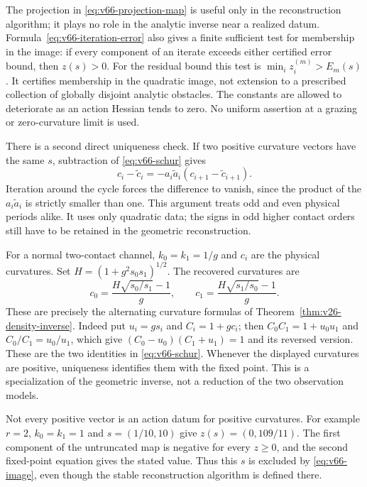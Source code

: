 The projection in \eqref{eq:v66-projection-map} is useful only in the
reconstruction algorithm; it plays no role in the analytic inverse near
a realized datum.  Formula~\eqref{eq:v66-iteration-error} also gives a
finite sufficient test for membership in the image: if every component
of an iterate exceeds either certified error bound, then $z(s)>0$.
For the residual bound this test is $\min_i z_i^{(m)}>E_m(s)$.
It certifies membership in the quadratic image, not extension to a
prescribed collection of globally disjoint analytic obstacles.
The constants are allowed to deteriorate as an action Hessian tends to
zero.  No uniform assertion at a grazing or zero-curvature limit is used.

There is a second direct uniqueness check.  If two positive curvature
vectors have the same $s$, subtraction of \eqref{eq:v66-schur} gives
\[
 c_i-\widetilde c_i
       =-a_i\widetilde a_i(c_{i+1}-\widetilde c_{i+1}).
\]
Iteration around the cycle forces the difference to vanish, since the
product of the $a_i\widetilde a_i$ is strictly smaller than one.
This argument treats odd and even physical periods alike.  It uses only
quadratic data; the signs in odd higher contact orders still have to be
retained in the geometric reconstruction.

For a normal two-contact channel, $k_0=k_1=1/g$ and $c_i$ are the
physical curvatures.  Set $H=(1+g^2s_0s_1)^{1/2}$.  The recovered
curvatures are
\[
 c_0=\frac{H\sqrt{s_0/s_1}-1}{g},\qquad
 c_1=\frac{H\sqrt{s_1/s_0}-1}{g}.
\]
These are precisely the alternating curvature formulas of
Theorem~\ref{thm:v26-density-inverse}.  Indeed put
$u_i=gs_i$ and $C_i=1+gc_i$; then $C_0C_1=1+u_0u_1$ and
$C_0/C_1=u_0/u_1$, which give
$(C_0-u_0)(C_1+u_1)=1$ and its reversed version.
These are the two identities in \eqref{eq:v66-schur}.
Whenever the displayed curvatures are positive, uniqueness identifies
them with the fixed point.  This is a specialization of the geometric
inverse, not a reduction of the two observation models.

Not every positive vector is an action datum for positive curvatures.
For example $r=2$, $k_0=k_1=1$ and $s=(1/10,10)$ give
$z(s)=(0,109/11)$.  The first component of the untruncated map is
negative for every $z\ge0$, and the second fixed-point equation gives
the stated value.  Thus this $s$ is excluded by \eqref{eq:v66-image},
even though the stable reconstruction algorithm is defined there.

